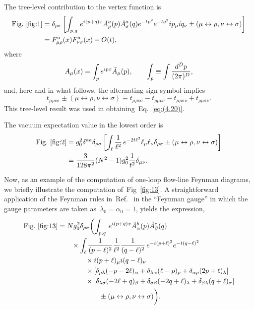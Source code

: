 The tree-level contribution to the vertex function is
\begin{align}
   \text{Fig.~\ref{fig:1}}
   &=\delta_{\rho\sigma}\left[
   \int_{p,q}\,e^{i(p+q)x}\Tilde{A}_\rho^a(p)\Tilde{A}_\sigma^a(q)
   e^{-tp^2}e^{-tq^2}ip_\mu iq_\nu
   \pm(\mu\leftrightarrow\rho,\nu\leftrightarrow\sigma)\right]
\notag\\
   &=F_{\mu\rho}^a(x)F_{\nu\sigma}^a(x)+O(t),
\label{eq:(5.9)}
\end{align}
where
\begin{equation}
   A_\mu(x)=\int_pe^{ipx}\Tilde{A}_\mu(p),\qquad
   \int_p\equiv\int\frac{d^Dp}{(2\pi)^D},
\label{eq:(5.10)}
\end{equation}
and, here and in what follows, the alternating-sign symbol implies
\begin{equation}
   t_{\mu\rho\nu\sigma}\pm(\mu\leftrightarrow\rho,\nu\leftrightarrow\sigma)
   \equiv
   t_{\mu\rho\nu\sigma}-t_{\rho\mu\nu\sigma}-t_{\mu\rho\sigma\nu}
   +t_{\rho\mu\sigma\nu}.
\label{eq:(5.11)}
\end{equation}
This tree-level result was used in obtaining~Eq.~\eqref{eq:(4.20)}.

The vacuum expectation value in the lowest order is
\begin{align}
   \text{Fig.~\ref{fig:2}}&=g_0^2\delta^{aa}\delta_{\rho\sigma}
   \left[\int_\ell\frac{1}{\ell^2}\,e^{-2t\ell^2}
   \ell_\mu\ell_\nu\delta_{\rho\sigma}
   \pm(\mu\leftrightarrow\rho,\nu\leftrightarrow\sigma)\right]
\notag\\
   &=\frac{3}{128\pi^2}(N^2-1)
   g_0^2\frac{1}{t^2}\delta_{\mu\nu}.
\label{eq:(5.12)}
\end{align}

Now, as an example of the computation of one-loop flow-line Feynman diagrams,
we briefly illustrate the computation of~Fig~\ref{fig:13}. A straightforward
application of the Feynman rules in~Ref.~\cite{Luscher:2011bx} in the
``Feynman gauge'' in which the gauge parameters are taken
as~$\lambda_0=\alpha_0=1$, yields the expression,
\begin{align}
   \text{Fig.~\ref{fig:13}}
   &=Ng_0^2\delta_{\rho\sigma}\biggl(
   \int_{p,q}\,e^{i(p+q)x}\Tilde{A}_\alpha^b(p)\Tilde{A}_\beta^c(q)
\notag\\
   &\qquad{}\times
   \int_\ell
   \frac{1}{(p+\ell)^2}\frac{1}{\ell^2}\frac{1}{(q-\ell)^2}\,
   e^{-t(p+\ell)^2}e^{-t(q-\ell)^2}
\notag\\
   &\qquad\qquad{}\times
   i(p+\ell)_\mu i(q-\ell)_\nu
\notag\\
   &\qquad\qquad{}\times
   \left[\delta_{\rho\lambda}(-p-2\ell)_\alpha
   +\delta_{\lambda\alpha}(\ell-p)_\rho
   +\delta_{\alpha\rho}(2p+\ell)_\lambda\right]
\notag\\
   &\qquad\qquad{}\times
   \left[\delta_{\lambda\sigma}(-2\ell+q)_\beta
   +\delta_{\sigma\beta}(-2q+\ell)_\lambda
   +\delta_{\beta\lambda}(q+\ell)_\sigma\right]
\notag\\
   &\qquad\qquad\qquad{}\pm(\mu\leftrightarrow\rho,\nu\leftrightarrow\sigma)
   \biggr).
\label{eq:(5.13)}
\end{align}

